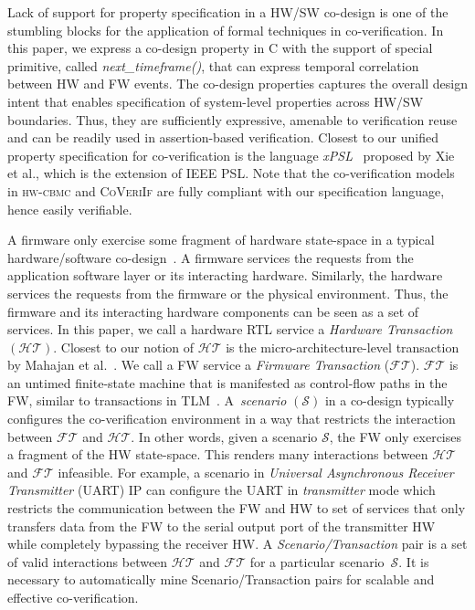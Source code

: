 \documentclass[sigconf]{acmart}
\newcommand{\tool}[1]{\textsc{#1}\xspace}
\newcommand{\hwcbmcv}{\tool{hw-cbmc}}
\newcommand{\verifox}{\tool{CoVeriIf}}
\begin{document}
Lack of support for property specification in a HW/SW co-design is one of the
stumbling blocks for the application of formal techniques in co-verification.  
In this paper, we express a co-design property in C 
with the support of special primitive, called {\em next\_timeframe()}, 
that can express temporal correlation between HW and FW events. 
The co-design properties captures the overall design intent that enables
specification of system-level properties across HW/SW boundaries. Thus, 
they are sufficiently expressive, amenable to verification reuse and can be 
readily used in assertion-based verification.  Closest to our
unified property specification for co-verification is the language
\textit{xPSL}~\cite{xPSL} proposed by Xie et al., which is the extension of IEEE PSL.  
Note that the co-verification models in \hwcbmcv and \verifox are fully compliant 
with our specification language, hence easily verifiable.  
%


A firmware only exercise some fragment of hardware state-space in a typical 
hardware/software
co-design~\cite{polig2014micro,polig2014fpl,giefers2015accelerating}.  
A firmware services the requests from the application software 
layer or its interacting hardware.  Similarly, the hardware services 
the requests from the firmware or the
physical environment.  Thus, the firmware and its interacting hardware
components can be seen as a set of services.  In this paper, we call a
hardware RTL service a {\em Hardware Transaction} $(\mathcal{HT})$.  Closest
to our notion of $\mathcal{HT}$ is the micro-architecture-level transaction
by Mahajan et al.~\cite{mcbmq}.  We call a FW service a {\em Firmware
Transaction} ($\mathcal{FT}$).  $\mathcal{FT}$ is an untimed finite-state
machine that is manifested as control-flow paths in the FW, similar to
transactions in TLM~\cite{codes14}.  A~{\em scenario} $(\mathcal{S})$ in a
co-design typically configures the co-verification environment in a way that
restricts the interaction between $\mathcal{FT}$ and $\mathcal{HT}$.  In
other words, given a scenario $\mathcal{S}$, the FW only exercises a fragment
of the HW state-space.  This renders many interactions between
$\mathcal{HT}$ and $\mathcal{FT}$ infeasible. For example, a scenario in 
\emph{Universal Asynchronous Receiver Transmitter} (UART) IP can configure the 
UART in \emph{transmitter} mode which restricts the communication between the FW 
and HW to set of services that only transfers data from the FW to the serial output 
port of the transmitter HW while completely bypassing the receiver HW.  
A {\em Scenario/Transaction} pair is a set of valid interactions between 
$\mathcal{HT}$ and $\mathcal{FT}$ for a particular scenario~$\mathcal{S}$.  
It is necessary to automatically mine Scenario/Transaction pairs for scalable 
and effective co-verification.
\end{document}
